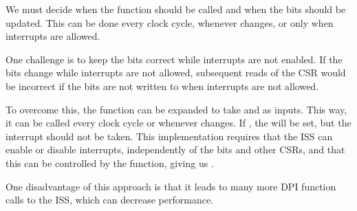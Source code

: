We must decide when the  function should be called and when the  bits should be updated. This can be done every clock cycle, whenever  changes, or only when interrupts are allowed.


One challenge is to keep the  bits correct while interrupts are not enabled. If the  bits change while interrupts are not allowed, subsequent reads of the  CSR would be incorrect if the  bits are not written to when interrupts are not allowed.


To overcome this, the  function can be expanded to take  and  as inputs. This way, it can be called every clock cycle or whenever  changes. If , the  will be set, but the interrupt should not be taken. This implementation requires that the ISS can enable or disable interrupts, independently of the  bits and other CSRs, and that this can be controlled by the  function, giving us . 

One disadvantage of this approach is that it leads to many more DPI function calls to the ISS, which can decrease performance.










